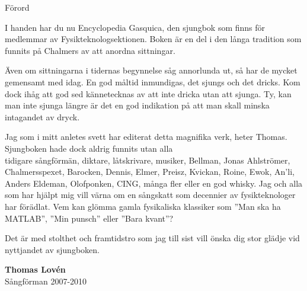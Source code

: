 \begin{flushleft}
{\Huge Förord\\}
\end{flushleft}

{\large
I handen har du nu Encyclopedia Gasquica, den sjungbok som finns för medlemmar av Fysikteknologsektionen.
Boken är en del i den långa tradition som funnits på Chalmers av att anordna sittningar.

Även om sittningarna i tidernas begynnelse såg annorlunda ut, så har de mycket gemensamt med idag.
En god måltid inmundigas, det sjungs och det dricks.
Kom dock ihåg att god sed kännetecknas av att inte dricka utan att sjunga.
Ty, kan man inte sjunga längre är det en god indikation på att man skall minska intagandet av dryck.

Jag som i mitt anletes svett har editerat detta magnifika verk, heter Thomas.
Sjungboken hade dock aldrig funnits utan alla \\tidigare sångförmän, diktare, låtskrivare, musiker, Bellman, Jonas Ahlströmer, Chalmersspexet, Barocken,
Dennis, Elmer, Preisz, Kvickan, Roine, Ewok, An'li, Anders Eldeman, Olofponken, CING, många fler eller en god whisky.
Jag och alla som har hjälpt mig vill värna om en sångskatt som decennier av fysikteknologer har förädlat.
Vem kan glömma gamla fysikaliska klassiker som ''Man ska ha MATLAB'', ''Min punsch'' eller ''Bara kvant''?

Det är med stolthet och framtidstro som jag till sist vill önska dig stor glädje vid nyttjandet av sjungboken.

\vspace{0.5cm}
\begin{flushright}
\textbf{Thomas Lovén}\\
Sångförman 2007-2010
\end{flushright}
}

\newpage

